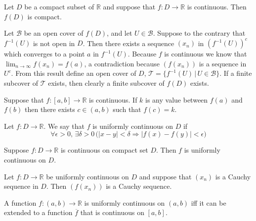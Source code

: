\documentclass[nobib,notoc]{tufte-handout}
\begin{document}
\begin{thm}
	Let \(D\) be a compact subset of \(\mathbb{R}\) and suppose that \(f:D\rightarrow\mathbb{R}\) is continuous. Then \(f(D)\) is compact.
	\begin{IEEEproof}
		Let \(\mathscr{B}\) be an open cover of \(f(D)\), and let \(U\in\mathscr{B}\). Suppose to the contrary that \(f^{-1}(U)\) is not open in \(D\). Then there exists a sequence \((x_n)\) in \((f^{-1}(U))^c\) which converges to a point \(a\) in \(f^{-1}(U)\). Because \(f\) is continuous we know that \(\lim_{n\rightarrow\infty}f(x_n)=f(a)\), a contradiction because \((f(x_n))\) is a sequence in \(U^c\). From this result define an open cover of \(D\), \(\mathscr{T}=\{f^{-1}(U)\,|\,U\in\mathscr{B}\}\). If a finite subcover of \(\mathscr{T}\) exists, then clearly a finite subcover of \(f(D)\) exists.
	\end{IEEEproof}
\end{thm}
\begin{thm}
	Suppose that \(f:[a,b]\rightarrow\mathbb{R}\) is continuous. If \(k\) is any value between \(f(a)\) and \(f(b)\) then there exists \(c\in(a,b)\) such that \(f(c)=k\).
\end{thm}
\begin{defi}
	Let \(f:D\rightarrow\mathbb{R}\). We say that \(f\) is uniformly continuous on \(D\) if
	\begin{equation*}
		\forall\epsilon>0,\,\exists\delta>0\,\big(\lvert x-y\rvert<\delta\Rightarrow\lvert f(x)-f(y)\rvert<\epsilon\big)
	\end{equation*}
\end{defi}
\begin{thm}
	Suppose \(f:D\rightarrow\mathbb{R}\) is continuous on compact set \(D\). Then \(f\) is uniformly continuous on \(D\).
\end{thm}
\begin{thm}
	Let \(f:D\rightarrow\mathbb{R}\) be uniformly continuous on \(D\) and suppose that \((x_n)\) is a Cauchy sequence in \(D\). Then \((f(x_n))\) is a Cauchy sequence.
\end{thm}
\begin{thm}
	A function \(f:(a,b)\rightarrow\mathbb{R}\) is uniformly continuous on \((a,b)\) iff it can be extended to a function \(\overline{f}\) that is continuous on \([a,b]\).
\end{thm}
\clearpage
\end{document}
